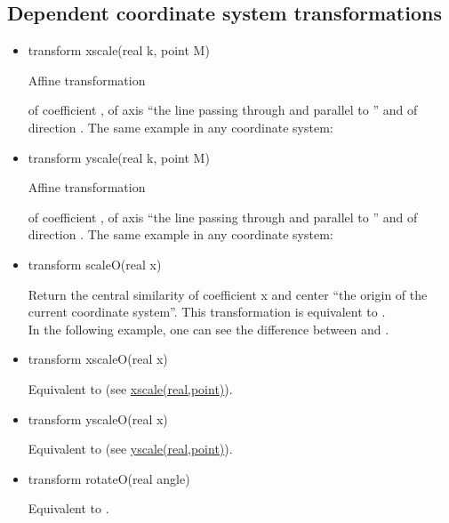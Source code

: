 \documentclass[pdftex]{article}
\begin{document}
\subsection{Dependent coordinate system transformations}
\begin{itemize}
\item {}
  \begin{Vcolor}
    transform xscale(real k, point M)
  \end{Vcolor}
  \hypertarget{xscale(real,point)}{Affine transformation} of
  coefficient , of axis ``the line passing through  and
  parallel to '' and of direction .
  The same example in any coordinate system:
\item {}
  \begin{Vcolor}
    transform yscale(real k, point M)
  \end{Vcolor}
  \hypertarget{yscale(real,point)}{Affine transformation} of
  coefficient , of axis ``the line passing through  and
  parallel to '' and of direction .
  The same example in any coordinate system:
\item {}
  \begin{Vcolor}
    transform scaleO(real x)
  \end{Vcolor}
  Return the central similarity of coefficient  x and center ``the
  origin of the current coordinate system''. This transformation is
  equivalent to  .\\
  In the following example, one can see the difference between
   and .
\item {}
  \begin{Vcolor}
    transform xscaleO(real x)
  \end{Vcolor}
  Equivalent to  (see \href{#xscale(real,point)}{xscale(real,point)}).
\item {}
  \begin{Vcolor}
    transform yscaleO(real x)
  \end{Vcolor}
  Equivalent to  (see \href{#yscale(real,point)}{yscale(real,point)}).
\item {}
  \begin{Vcolor}
    transform rotateO(real angle)
  \end{Vcolor}
  Equivalent to .
\end{itemize}
\end{document}
